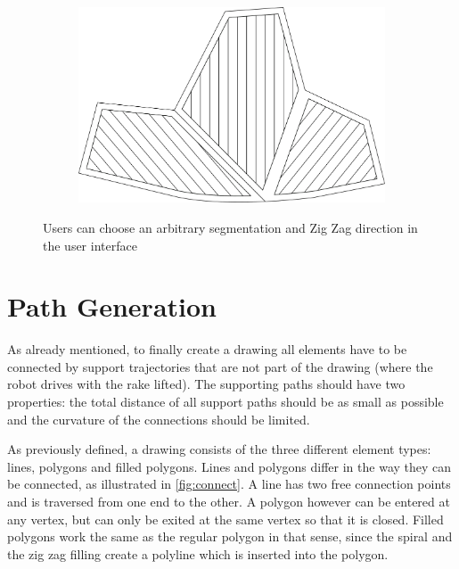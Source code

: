 \begin{figure}
\centering
\begin{subfigure}[b]{0.8\textwidth}
\includegraphics[width=\textwidth]{images/path_planning/zigzag_user_segment_and_fill.pdf}
\end{subfigure}
\caption{Users can choose an arbitrary segmentation and Zig Zag direction in the user interface}
\end{figure}

\section{Path Generation}
As already mentioned, to finally create a drawing all elements have to be connected by support trajectories that are not part of the drawing (where the robot drives with the rake lifted). The supporting paths should have two properties: the total distance of all support paths should be as small as possible and the curvature of the connections should be limited.

As previously defined, a drawing consists of the three different element types: lines, polygons and filled polygons. Lines and polygons differ in the way they can be connected, as illustrated in \autoref{fig:connect}. A line has two free connection points and is traversed from one end to the other. A polygon however can be entered at any vertex, but can only be exited at the same vertex so that it is closed. Filled polygons work the same as the regular polygon in that sense, since the spiral and the zig zag filling create a polyline which is inserted into the polygon.

